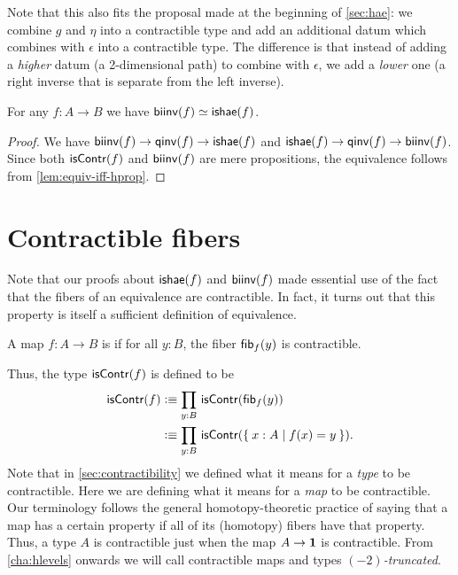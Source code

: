 Note that this also fits the proposal made at the beginning of \autoref{sec:hae}: we combine $g$ and $\eta$ into a contractible type and add an additional datum which combines with $\epsilon$ into a contractible type.
The difference is that instead of adding a \emph{higher} datum (a 2-dimensional path) to combine with $\epsilon$, we add a \emph{lower} one (a right inverse that is separate from the left inverse).

\begin{cor}\label{thm:equiv-biinv-isequiv}
  For any $f:A\to B$ we have $\mathsf{biinv}(f) \simeq \mathsf{ishae}(f)$.
\end{cor}
\begin{proof}
  We have $\mathsf{biinv}(f) \to \mathsf{qinv}(f) \to \mathsf{ishae}(f)$ and $\mathsf{ishae}(f) \to \mathsf{qinv}(f) \to \mathsf{biinv}(f)$.
  Since both $\mathsf{isContr}(f)$ and $\mathsf{biinv}(f)$ are mere propositions, the equivalence follows from \autoref{lem:equiv-iff-hprop}.
\end{proof}


\section{Contractible fibers}
\label{sec:contrf}

Note that our proofs about $\mathsf{ishae}(f)$ and $\mathsf{biinv}(f)$ made essential use of the fact that the fibers of an equivalence are contractible.
In fact, it turns out that this property is itself a sufficient definition of equivalence.

\begin{defn} \label{defn:equivalence}
  A map $f:A\to B$ is  if for all $y:B$, the fiber ${\mathsf{fib}}_{f}(y)$ is contractible.
\end{defn}

Thus, the type $\mathsf{isContr}(f)$ is defined to be
\begin{align}
  \iscontr(f) &\defeq \prd{y:B} \iscontr(\hfib f y)\\
  &\defeq \prd{y:B} \iscontr (\setof{x:A | f(x) = y}).\label{eq:iscontrf}
\end{align}
Note that in \autoref{sec:contractibility} we defined what it means for a \emph{type} to be contractible.
Here we are defining what it means for a \emph{map} to be contractible.
Our terminology follows the general homotopy-theoretic practice of saying that a map has a certain property if all of its (homotopy) fibers have that property.
Thus, a type $A$ is contractible just when the map $A\to\mathbf{1}$ is contractible.
From \autoref{cha:hlevels} onwards we will call contractible maps and types \emph{$(-2)$-truncated}.

